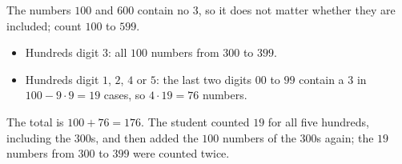 The numbers $100$ and $600$ contain no $3$, so it does not matter whether they are included; count $100$ to $599$.
\begin{itemize}
\item Hundreds digit $3$: all $100$ numbers from $300$ to $399$.
\item Hundreds digit $1$, $2$, $4$ or $5$: the last two digits $00$ to $99$ contain a $3$ in $100-9\cdot9=19$ cases, so $4\cdot19=76$ numbers.
\end{itemize}
The total is $100+76=\boxed{176}$. The student counted $19$ for all five hundreds, including the $300$s, and then added the $100$ numbers of the $300$s again; the $19$ numbers from $300$ to $399$ were counted twice.
